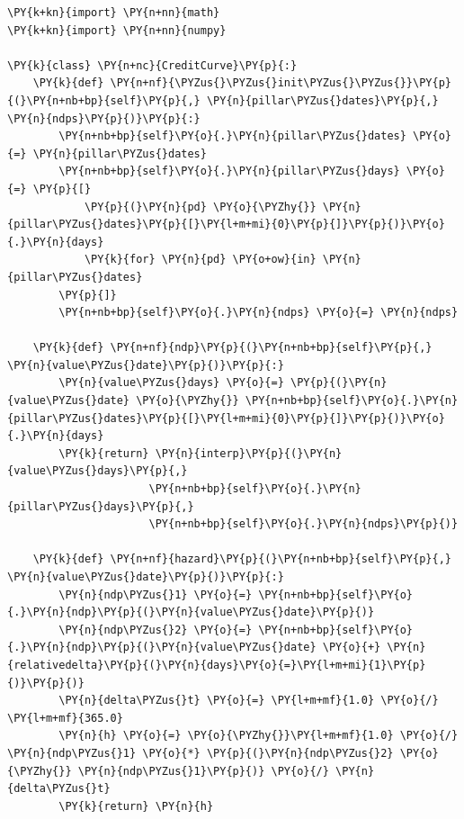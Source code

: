\begin{tcolorbox}[breakable, size=fbox, boxrule=1pt, pad at break*=1mm,colback=cellbackground, colframe=cellborder]
\begin{Verbatim}[commandchars=\\\{\}]
\PY{k+kn}{import} \PY{n+nn}{math}
\PY{k+kn}{import} \PY{n+nn}{numpy}

\PY{k}{class} \PY{n+nc}{CreditCurve}\PY{p}{:}
    \PY{k}{def} \PY{n+nf}{\PYZus{}\PYZus{}init\PYZus{}\PYZus{}}\PY{p}{(}\PY{n+nb+bp}{self}\PY{p}{,} \PY{n}{pillar\PYZus{}dates}\PY{p}{,} \PY{n}{ndps}\PY{p}{)}\PY{p}{:}    
        \PY{n+nb+bp}{self}\PY{o}{.}\PY{n}{pillar\PYZus{}dates} \PY{o}{=} \PY{n}{pillar\PYZus{}dates}
        \PY{n+nb+bp}{self}\PY{o}{.}\PY{n}{pillar\PYZus{}days} \PY{o}{=} \PY{p}{[}
            \PY{p}{(}\PY{n}{pd} \PY{o}{\PYZhy{}} \PY{n}{pillar\PYZus{}dates}\PY{p}{[}\PY{l+m+mi}{0}\PY{p}{]}\PY{p}{)}\PY{o}{.}\PY{n}{days}
            \PY{k}{for} \PY{n}{pd} \PY{o+ow}{in} \PY{n}{pillar\PYZus{}dates}
        \PY{p}{]}
        \PY{n+nb+bp}{self}\PY{o}{.}\PY{n}{ndps} \PY{o}{=} \PY{n}{ndps}
        
    \PY{k}{def} \PY{n+nf}{ndp}\PY{p}{(}\PY{n+nb+bp}{self}\PY{p}{,} \PY{n}{value\PYZus{}date}\PY{p}{)}\PY{p}{:}
        \PY{n}{value\PYZus{}days} \PY{o}{=} \PY{p}{(}\PY{n}{value\PYZus{}date} \PY{o}{\PYZhy{}} \PY{n+nb+bp}{self}\PY{o}{.}\PY{n}{pillar\PYZus{}dates}\PY{p}{[}\PY{l+m+mi}{0}\PY{p}{]}\PY{p}{)}\PY{o}{.}\PY{n}{days}
        \PY{k}{return} \PY{n}{interp}\PY{p}{(}\PY{n}{value\PYZus{}days}\PY{p}{,}
                      \PY{n+nb+bp}{self}\PY{o}{.}\PY{n}{pillar\PYZus{}days}\PY{p}{,}
                      \PY{n+nb+bp}{self}\PY{o}{.}\PY{n}{ndps}\PY{p}{)}
    
    \PY{k}{def} \PY{n+nf}{hazard}\PY{p}{(}\PY{n+nb+bp}{self}\PY{p}{,} \PY{n}{value\PYZus{}date}\PY{p}{)}\PY{p}{:}
        \PY{n}{ndp\PYZus{}1} \PY{o}{=} \PY{n+nb+bp}{self}\PY{o}{.}\PY{n}{ndp}\PY{p}{(}\PY{n}{value\PYZus{}date}\PY{p}{)}
        \PY{n}{ndp\PYZus{}2} \PY{o}{=} \PY{n+nb+bp}{self}\PY{o}{.}\PY{n}{ndp}\PY{p}{(}\PY{n}{value\PYZus{}date} \PY{o}{+} \PY{n}{relativedelta}\PY{p}{(}\PY{n}{days}\PY{o}{=}\PY{l+m+mi}{1}\PY{p}{)}\PY{p}{)}
        \PY{n}{delta\PYZus{}t} \PY{o}{=} \PY{l+m+mf}{1.0} \PY{o}{/} \PY{l+m+mf}{365.0}
        \PY{n}{h} \PY{o}{=} \PY{o}{\PYZhy{}}\PY{l+m+mf}{1.0} \PY{o}{/} \PY{n}{ndp\PYZus{}1} \PY{o}{*} \PY{p}{(}\PY{n}{ndp\PYZus{}2} \PY{o}{\PYZhy{}} \PY{n}{ndp\PYZus{}1}\PY{p}{)} \PY{o}{/} \PY{n}{delta\PYZus{}t}
        \PY{k}{return} \PY{n}{h}
\end{Verbatim}
\end{tcolorbox}    

